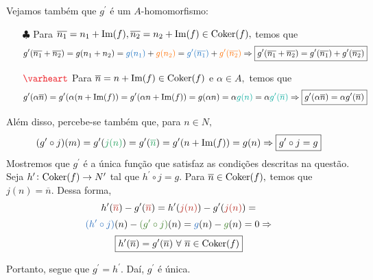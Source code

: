 \documentclass[11pt,a4paper]{article}
\begin{document}
Vejamos também que $g^{\prime}$ é um $A$-homomorfismo:
\begin{itemize}
    \item[$\clubsuit$] Para $\overline{n_1} = n_1 + \mbox{Im}(f), \overline{n_2} = n_2 + \mbox{Im}(f) \in {\rm Coker}(f),$ temos que
    \[
    g^{\prime}(\overline{n_1} + \overline{n_2}) = g(n_1 + n_2) = \textcolor{RoyalBlue}{g(n_1)} + \textcolor{Laranja}{g(n_2)} = \textcolor{RoyalBlue}{g^{\prime}(\overline{n_1})} + \textcolor{Laranja}{g^{\prime}(\overline{n_2})} \Rightarrow \boxed{g^{\prime}(\overline{n_1} + \overline{n_2}) = g^{\prime}(\overline{n_1}) + g^{\prime}(\overline{n_2})}
    \]
    \item[$\textcolor{Red}{\varheart}$] Para $\overline{n} = n + \mbox{Im}(f) \in {\rm Coker}(f)$ e $\alpha \in A,$ temos que
    \[
    g^{\prime}(\alpha \overline{n}) = g^{\prime}(\alpha (n + \mbox{Im}(f)) = g^{\prime}(\alpha n + \mbox{Im}(f)) = g(\alpha n) = \alpha \textcolor{JungleGreen}{g(n)} = \alpha \textcolor{JungleGreen}{g^{\prime}(\overline{n})} \Rightarrow \boxed{g^{\prime}(\alpha \overline{n}) = \alpha g^{\prime}( \overline{n})}
    \]
\end{itemize}

Além disso, percebe-se também que, para $n \in N,$
\[
(g^{\prime} \circ j)(m) = g^{\prime}(\textcolor{ForestGreen}{j(n)}) =  g^{\prime}(\textcolor{ForestGreen}{\overline{n}}) = g^{\prime}(n + \mbox{Im}(f)) = g(n) \Rightarrow \boxed{g^{\prime} \circ j = g}
\]
Mostremos que $g^{\prime}$ é a única função que satisfaz as condições descritas na questão. Seja $h^{\prime} \colon {\rm Coker}(f) \to N^{\prime}$ tal que $h^{\prime} \circ j = g.$ Para $\overline{n} \in {\rm Coker}(f),$ temos que $j(n) = \overline{n}.$ Dessa forma,
\[
h^{\prime}(\textcolor{BrickRed}{\overline{n}}) - g^{\prime}(\textcolor{BrickRed}{\overline{n}}) = h^{\prime}(\textcolor{BrickRed}{j(n)}) - g^{\prime}(\textcolor{BrickRed}{j(n)}) =\]\[ \textcolor{NavyBlue}{(h^{\prime} \circ j)}(n) - \textcolor{OliveGreen}{(g^{\prime} \circ j)}(n) =   \textcolor{NavyBlue}{g}(n) - \textcolor{OliveGreen}{g}(n) = 0 \Rightarrow \]\[ \boxed{h^{\prime}(\overline{n}) = g^{\prime}(\overline{n}) \ \forall \ \overline{n} \in {\rm Coker}(f)}
\]

Portanto, segue que $g^{\prime} = h^{\prime}.$ Daí, $g^{\prime}$ é única.
\end{document}
